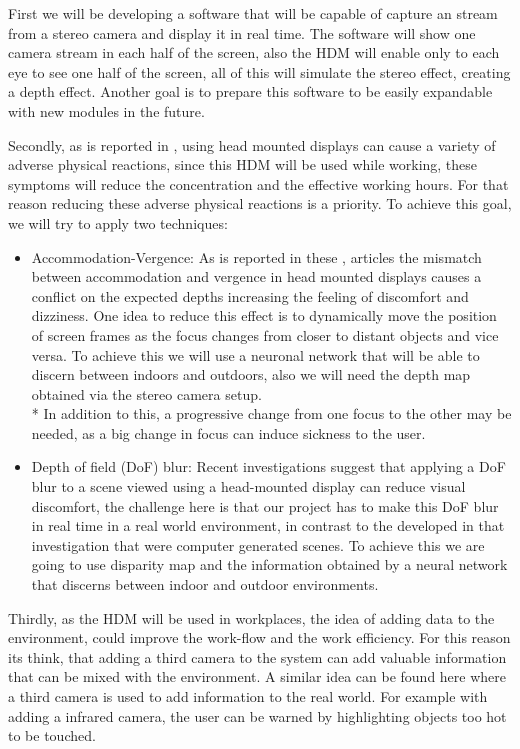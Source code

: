 \documentclass[10pt,a4paper,twocolumn,twoside]{article}
\begin{document}
First we will be developing a software that will be capable of capture an stream from a stereo camera and display it in real time. The software will show one camera stream in each half of the screen, also the HDM will enable only to each eye to see one half of the screen, all of this will simulate the stereo effect, creating a depth effect. Another goal is to prepare this software to be easily expandable with new modules in the future.

Secondly, as is reported in \cite{disconfortReview}, using head mounted displays can cause a variety of adverse physical reactions, since this HDM will be used while working, these symptoms will reduce the concentration and the effective working hours. For that reason reducing these adverse physical reactions is a priority. To achieve this goal, we will try to apply two techniques: 

\begin{itemize}
	\item Accommodation-Vergence: As is reported in these \cite{disconfortReview}, \cite{vergenceDisconfort} articles the mismatch between accommodation and vergence in head mounted displays causes a conflict on the expected depths increasing the feeling of discomfort and dizziness.  One idea to reduce this effect is to dynamically move the position of screen frames as the focus changes from closer to distant objects and vice versa. To achieve this we will use a neuronal network that will be able to discern between indoors and outdoors, also we will need the depth map obtained via the stereo camera setup. \\*
	In addition to this, a progressive change from one focus to the other may be needed, as a big change in focus can induce sickness to the user.
	
	\item Depth of field (DoF) blur: Recent investigations \cite{ifftConfortDoF} suggest that applying a DoF blur to a scene viewed using a head-mounted display can reduce visual discomfort, the challenge here is that our project has to make this DoF blur in real time in a real world environment, in contrast to the developed in that investigation that were computer generated scenes. To achieve this we are going to use disparity map and the information obtained by a neural network that discerns between indoor and outdoor environments.
\end{itemize} 

Thirdly, as the HDM will be used in workplaces, the idea of adding data to the environment, could improve the work-flow and the work efficiency. For this reason its think, that adding a third camera to the system can add valuable information that can be mixed with the environment. A similar idea can be found here \cite{vismerge} where a third camera is used to add information to the real world. For example with adding a infrared camera, the user can be warned by highlighting objects too hot to be touched.
\end{document}
